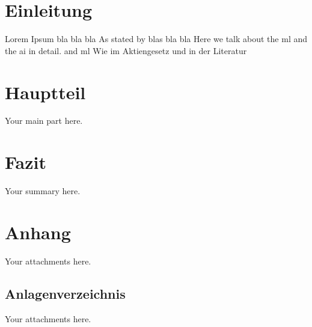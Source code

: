 \documentclass[12pt,a4paper]{article}
\begin{document}
\newpage

\tableofcontents
\thispagestyle{empty}
\newpage

\printglossary[type=\acronymtype, title=Abkürzungsverzeichnis]
\thispagestyle{empty}
\newpage

\section{Einleitung}
Lorem Ipsum bla\autocite{moews_kosten-_2002} bla bla As stated by 
blas bla bla 
Here we talk about the \gls{ml} and the \gls{ai} in detail. and \gls{ml}
Wie im Aktiengesetz \autocite{aktg1965} und in der Literatur

\section{Hauptteil}
Your main part here.

\section{Fazit}
Your summary here.


\newpage
\printbibliography[title=Quellenverzeichnisverzeichnis, heading=bibnumbered]
\newpage

\printbibliography[category=law, title=Rechtsquellenverzeichnis, heading=bibnumbered]
\newpage

\section{Anhang}
Your attachments here.

\subsection{Anlagenverzeichnis}
Your attachments here.
\end{document}
